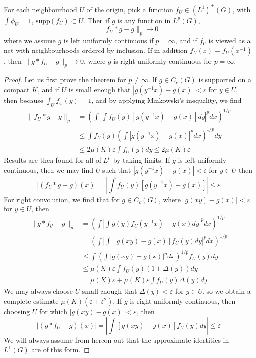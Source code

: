 \begin{theorem}
    For each neighbourhood $U$ of the origin, pick a function $f_U \in (L^1)^+(G)$, with $\int \phi_U = 1$, $\text{supp}(f_U) \subset U$. Then if $g$ is any function in $L^p(G)$,
    \[ \| f_U * g - g \|_p \to 0 \]
    where we assume $g$ is left uniformly continuous if $p = \infty$, and if $f_U$ is viewed as a net with neighbourhoods ordered by inclusion. If in addition $f_U(x) = f_U(x^{-1})$, then $\| g * f_U - g \|_p \to 0$, where $g$ is right uniformly continuous for $p = \infty$.
\end{theorem}
\begin{proof}
    Let us first prove the theorem for $p \neq \infty$. If $g \in C_c(G)$ is supported on a compact $K$, and if $U$ is small enough that $|g(y^{-1}x) - g(x)| < \varepsilon$ for $y \in U$, then because $\int_U f_U(y) = 1$, and by applying Minkowski's inequality, we find
    \begin{align*}
        \| f_U * g - g \|_p &= \left( \int \left| \int f_U(y) [g(y^{-1}x) - g(x)] dy \right|^p dx \right)^{1/p} \\
        &\leq \int f_U(y) \left( \int |g(y^{-1}x) - g(x)|^p dx \right)^{1/p} dy\\
        &\leq 2 \mu(K)\varepsilon \int f_U(y) dy \leq 2 \mu(K)\varepsilon
    \end{align*}
    Results are then found for all of $L^p$ by taking limits. If $g$ is left uniformly continuous, then we may find $U$ such that $|g(y^{-1}x) - g(x)| < \varepsilon$ for $y \in U$ then
    \[ |(f_U * g - g)(x)| = \left| \int f_U(y) [g(y^{-1}x) - g(x)] \right| \leq \varepsilon \]
    For right convolution, we find that for $g \in C_c(G)$, where $|g(xy) - g(x)| < \varepsilon$ for $y \in U$, then
    \begin{align*}
        \| g * f_U - g \|_p &= \left( \int \left| \int g(y) f_U(y^{-1}x) - g(x) dy \right|^p dx \right)^{1/p}\\
        &= \left( \int \left| \int [g(xy) - g(x)] f_U(y) dy \right|^p dx \right)^{1/p}\\
        &\leq \int \left( \int |g(xy) - g(x)|^p dx \right)^{1/p} f_U(y) dy\\
        &\leq \mu(K) \varepsilon \int f_U(y) (1 + \Delta(y)) dy\\
        &= \mu(K) \varepsilon + \mu(K) \varepsilon \int f_U(y) \Delta(y) dy
    \end{align*}
    We may always choose $U$ small enough that $\Delta(y) < \varepsilon$ for $y \in U$, so we obtain a complete estimate $\mu(K) (\varepsilon + \varepsilon^2)$. If $g$ is right uniformly continuous, then choosing $U$ for which $|g(xy) - g(x)| < \varepsilon$, then
    \[ |(g * f_U - g)(x)| = \left| \int [g(xy) - g(x)] f_U(y) dy \right| \leq \varepsilon \]
    We will always assume from hereon out that the approximate identities in $L^1(G)$ are of this form.
\end{proof}

